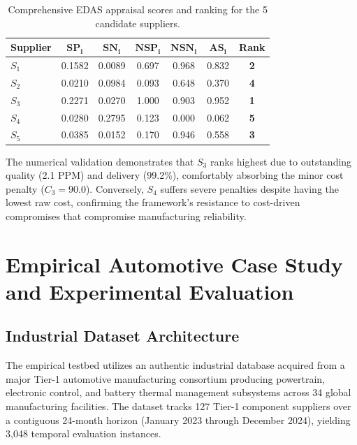 \documentclass[twocolumn,10pt]{article}
\begin{document}
\begin{table}[h]
\centering
\caption{Comprehensive EDAS appraisal scores and ranking for the 5 candidate suppliers.}
\label{tab:numerical_results}
\footnotesize
\begin{tabular}{lcccccc}
\toprule
\textbf{Supplier} & $\mathbf{SP_i}$ & $\mathbf{SN_i}$ & $\mathbf{NSP_i}$ & $\mathbf{NSN_i}$ & $\mathbf{AS_i}$ & \textbf{Rank} \\
\midrule
$S_1$ & 0.1582 & 0.0089 & 0.697 & 0.968 & 0.832 & \textbf{2} \\
$S_2$ & 0.0210 & 0.0984 & 0.093 & 0.648 & 0.370 & \textbf{4} \\
$S_3$ & 0.2271 & 0.0270 & 1.000 & 0.903 & 0.952 & \textbf{1} \\
$S_4$ & 0.0280 & 0.2795 & 0.123 & 0.000 & 0.062 & \textbf{5} \\
$S_5$ & 0.0385 & 0.0152 & 0.170 & 0.946 & 0.558 & \textbf{3} \\
\bottomrule
\end{tabular}
\end{table}

The numerical validation demonstrates that $S_3$ ranks highest due to outstanding quality (2.1 PPM) and delivery (99.2\%), comfortably absorbing the minor cost penalty ($C_3=90.0$). Conversely, $S_4$ suffers severe penalties despite having the lowest raw cost, confirming the framework's resistance to cost-driven compromises that compromise manufacturing reliability.

\section{Empirical Automotive Case Study and Experimental Evaluation}
\label{sec:empirical_case}

\subsection{Industrial Dataset Architecture}
The empirical testbed utilizes an authentic industrial database acquired from a major Tier-1 automotive manufacturing consortium producing powertrain, electronic control, and battery thermal management subsystems across 34 global manufacturing facilities. The dataset tracks 127 Tier-1 component suppliers over a contiguous 24-month horizon (January 2023 through December 2024), yielding 3,048 temporal evaluation instances.
\end{document}
